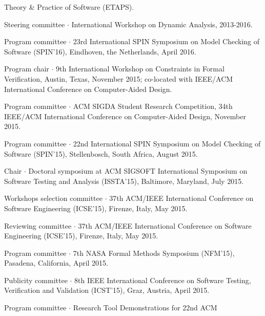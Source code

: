 \documentclass[ComputerScience]{vita}
\begin{document}
\begin{vita}
\begin{Panel and Committee Service}
  Theory \& Practice of Software (ETAPS).
\item Steering committee $\cdot$ International Workshop on Dynamic Analysis, 2013-2016.
\item Program committee $\cdot$ 23rd International SPIN Symposium on Model Checking of Software (SPIN'16), Eindhoven, the Netherlands, April 2016.
\item Program chair $\cdot$ 9th International Workshop on Constraints in Formal Verification, Austin, Texas, November 2015; co-located with IEEE/ACM International Conference on Computer-Aided Design.
\item Program committee $\cdot$ ACM SIGDA Student Research Competition, 34th IEEE/ACM International Conference on Computer-Aided Design, November 2015.
\item Program committee $\cdot$ 22nd International SPIN Symposium on Model Checking of Software (SPIN'15), Stellenbosch, South Africa, August 2015.
\item Chair $\cdot$ Doctoral symposium at ACM SIGSOFT International Symposium on Software Testing and Analysis (ISSTA'15), Baltimore, Maryland, July 2015. 
\item Workshops selection committee $\cdot$ 37th ACM/IEEE International Conference on Software Engineering (ICSE'15), Firenze, Italy, May 2015.
\item Reviewing committee $\cdot$ 37th ACM/IEEE International Conference on Software Engineering (ICSE'15), Firenze, Italy, May 2015.
\item Program committee $\cdot$ 7th NASA Formal Methods Symposium (NFM'15), Pasadena, California, April 2015. 
\item Publicity committee $\cdot$ 8th IEEE International Conference on Software Testing, Verification and Validation (ICST'15), Graz, Austria, April 2015.
\item Program committee $\cdot$ Research Tool Demonstrations for 22nd ACM

\end{Panel and Committee Service}
\end{vita}
\end{document}
